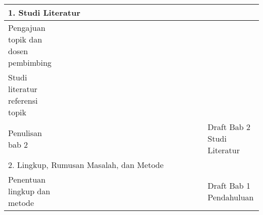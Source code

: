 \begin{landscape}
\begin{table}
\begin{tabularx}{\linewidth}{X *{18}{>{\centering\arraybackslash}m{15pt}}X}
            \multicolumn{20}{l}{1. Studi Literatur}                                                                                  \\ \midrule
            Pengajuan topik dan dosen pembimbing                          &   &   &  &
            \cellcolor[HTML]{333333}                                      &   &   &  &   &   &   &   &   &   &  &   &   &  &   &     \\ \cmidrule{1-1}
            Studi literatur referensi topik                               &   &   &  &   &
            \cellcolor[HTML]{333333}{\color[HTML]{333333} }               &
            \cellcolor[HTML]{333333}{\color[HTML]{333333} }               &   &   &  &   &   &   &   &   &   &  &   &                \\ \cmidrule{1-1}
            Penulisan bab 2                                               &   &   &  &   &   &
            \cellcolor[HTML]{333333}{\color[HTML]{333333} }               &
            \cellcolor[HTML]{333333}{\color[HTML]{333333} }               &   &   &  &   &   &   &   &   &   &  &   &
            \multirow{-3}{=}{Draft Bab 2 Studi Literatur}                                                                            \\ \midrule

            \multicolumn{20}{l}{2. Lingkup, Rumusan Masalah, dan Metode}                                                             \\ \midrule
            Penentuan lingkup dan metode                                  &   &   &  &   &   &   &   &
            \cellcolor[HTML]{333333}{\color[HTML]{333333} }               &
            \cellcolor[HTML]{333333}{\color[HTML]{333333} }               &
            \cellcolor[HTML]{333333}{\color[HTML]{333333} }               &   &   &  &   &   &   &   &   &
            Draft Bab 1 Pendahuluan                                                                                                  \\ \midrule


\end{tabularx}
\end{table}
\end{landscape}
